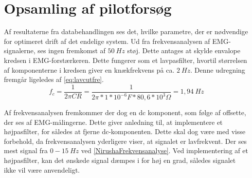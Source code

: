 \section{Opsamling af pilotforsøg}
Af resultaterne fra databehandlingen ses det, hvilke parametre, der er nødvendige for optimeret drift af det endelige system. Ud fra frekvensanalysen af EMG-signalerne, ses ingen fremkomst af $50~Hz$ støj. Dette antages at skylde envalope kredsen i EMG-forstærkeren. Dette fungerer som et lavpasfilter, hvortil størrelsen af komponenterne i kredsen giver en knækfrekvens på ca. $2~Hz$. Denne udregning fremgår ligeledes af \autoref{eq:lavcutfre}. 
\begin{equation}\label{eq:lavcutfre}
f_c = \frac{1}{2 \pi C R} = \frac{1}{2 \pi*1*10^{-6}F*80,6*10^3\Omega} = 1,94~Hz
\end{equation} 

Af frekvensanalysen fremkommer der dog en dc komponent, som følge af offsette, der ses af EMG-målingerne.  Dette giver anledning til, at implementere et højpasfilter, for således at fjerne dc-komponenten. Dette skal dog være med visse forbehold, da frekvensanalysen yderligere viser, at signalet er lavfrekvent. Der ses mest signal fra $0-15~Hz$ ved \autoref{NirushaFrekvensanalyse}. Ved implementering af et højpasfilter, kan det ønskede signal dæmpes i for høj en grad, således signalet ikke vil være anvendeligt. 
 